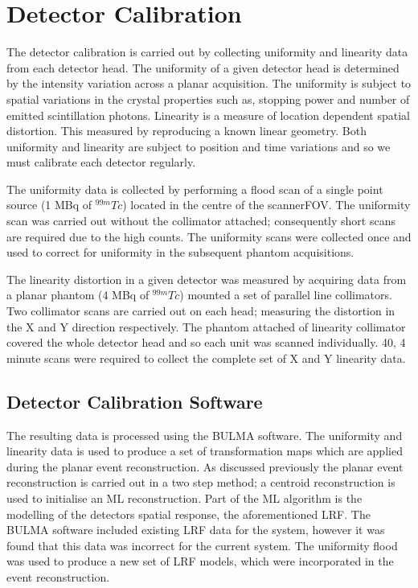 \section{Detector Calibration}
The detector calibration is carried out by collecting uniformity and linearity data from each detector head. The uniformity of a given detector head is determined by the intensity variation across a planar acquisition. The uniformity is subject to spatial variations in the crystal properties such as, stopping power and number of emitted scintillation photons. Linearity is a measure of location dependent spatial distortion. This measured by reproducing a known linear geometry. Both uniformity and linearity are subject to position and time variations and so we must calibrate each detector regularly.

The uniformity data is collected by performing a flood scan of a single point source (1 MBq of $^{99m}Tc$) located in the centre of the scanner\acrshort{FOV}. The uniformity scan was carried out without the collimator attached; consequently short scans are required due to the high counts. The uniformity scans were collected once and used to correct for uniformity in the subsequent phantom acquisitions. 

The linearity distortion in a given detector was measured by acquiring data from a planar phantom (4 MBq of $^{99m}Tc$) mounted a set of parallel line collimators. Two collimator scans are carried out on each head; measuring the distortion in the X and Y direction respectively. The phantom attached of linearity collimator covered the whole detector head and so each unit was scanned individually. 40, 4 minute scans were required to collect the complete set of X and Y linearity data. 

\subsection{Detector Calibration Software}
The resulting data is processed using the BULMA software. The uniformity and linearity data is used to produce a set of transformation maps which are applied during the planar event reconstruction. As discussed previously the planar event reconstruction is carried out in a two step method; a centroid reconstruction is used to initialise an \acrshort{ML} reconstruction. Part of the \acrshort{ML} algorithm is the modelling of the detectors spatial response, the aforementioned \acrshort{LRF}. The BULMA software included existing \acrshort{LRF} data for the system, however it was found that this data was incorrect for the current system. The uniformity flood was used to produce a new set of \acrshort{LRF} models, which were incorporated in the event reconstruction.

